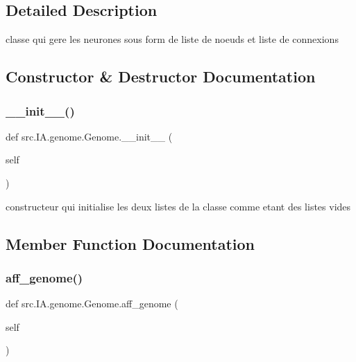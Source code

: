 \subsection{Detailed Description}
classe qui gere les neurones sous form de liste de noeuds et liste de connexions 

\subsection{Constructor \& Destructor Documentation}
\mbox{\label{classsrc_1_1_i_a_1_1genome_1_1_genome_aa2ac658a0a10371801446a2631bd4cab}} 
\subsubsection{\texorpdfstring{\+\_\+\+\_\+init\+\_\+\+\_\+()}{\_\_init\_\_()}}
{\footnotesize\ttfamily def src.\+I\+A.\+genome.\+Genome.\+\_\+\+\_\+init\+\_\+\+\_\+ (\begin{DoxyParamCaption}\item[{}]{self }\end{DoxyParamCaption})}



constructeur qui initialise les deux listes de la classe comme etant des listes vides 



\subsection{Member Function Documentation}
\mbox{\label{classsrc_1_1_i_a_1_1genome_1_1_genome_ae5bfcd0f717f5aa7ac272aacdeb1a95d}} 
\subsubsection{\texorpdfstring{aff\+\_\+genome()}{aff\_genome()}}
{\footnotesize\ttfamily def src.\+I\+A.\+genome.\+Genome.\+aff\+\_\+genome (\begin{DoxyParamCaption}\item[{}]{self }\end{DoxyParamCaption})}

